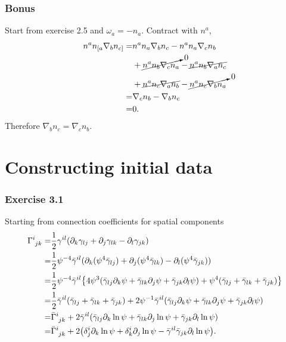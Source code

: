 \documentclass{article}
\begin{document}
\subsubsection*{Bonus}
Start from exercise 2.5 and $\omega_a = -n_a$. Contract with $n^a$,
\begin{align}
	n^an_{[a}\nabla_bn_{c]} =& n^an_a\nabla_bn_c - n^an_a\nabla_c n_b\\
	& + \cancelto{0}{n^an_b\nabla_c n_a} - \cancel{n^an_b\nabla_a n_c}\\
	& + \cancel{n^an_c\nabla_a n_b} - \cancelto{0}{n^an_c\nabla_b n_a}\\
	=& \nabla_cn_b - \nabla_bn_c\\
	=&0.
\end{align}
Therefore $\nabla_bn_c = \nabla_cn_b$.



\section{Constructing initial data}

\subsubsection*{Exercise 3.1}

Starting from connection coefficients for spatial components
\begin{align}
\Gamma\indices{^{i}_{jk}} = & \frac{1}{2}\gamma^{il}(\partial_k \gamma_{lj} + \partial_j \gamma_{lk} - \partial_l \gamma_{jk})\\
= & \frac{1}{2}\psi^{-4} \bar{\gamma}^{il} (\partial_k (\psi^4 \bar{\gamma}_{lj}) + \partial_j (\psi^4 \bar{\gamma}_{lk}) - \partial_l (\psi^4 \bar{\gamma}_{jk}))\\
= & \frac{1}{2}\psi^{-4}\bar{\gamma}^{il}\qty{4\psi^3 (\bar{\gamma}_{lj} \partial_k \psi + \bar{\gamma}_{lk}\partial_j \psi + \bar{\gamma}_{jk}\partial_l \psi ) + \psi^4 (\bar{\gamma}_{lj} + \bar{\gamma}_{lk} + \bar{\gamma}_{jk})} \\
= & \frac{1}{2}\bar{\gamma}^{il}(\bar{\gamma}_{lj} + \bar{\gamma}_{lk} + \bar{\gamma}_{jk}) + 2\psi^{-1} \bar{\gamma}^{il}(\bar{\gamma}_{lj}\partial_k \psi + \bar{\gamma}_{lk}\partial_j \psi + \bar{\gamma}_{jk}\partial_l \psi)\\
= & \tensor{\bar{\Gamma}}{^{i}_{jk}} + 2\bar{\gamma}^{il}(\bar{\gamma}_{lj}\partial_k \ln \psi + \bar{\gamma}_{lk}\partial_j \ln \psi + \bar{\gamma}_{jk}\partial_l \ln \psi)\\
= & \tensor{\bar{\Gamma}}{^{i}_{jk}} + 2\qty(\delta^i_j \partial_k \ln \psi + \delta^i_k \partial_j \ln \psi - \bar{\gamma}^{il}\bar{\gamma}_{jk}\partial_l \ln \psi).
\end{align}
\end{document}
